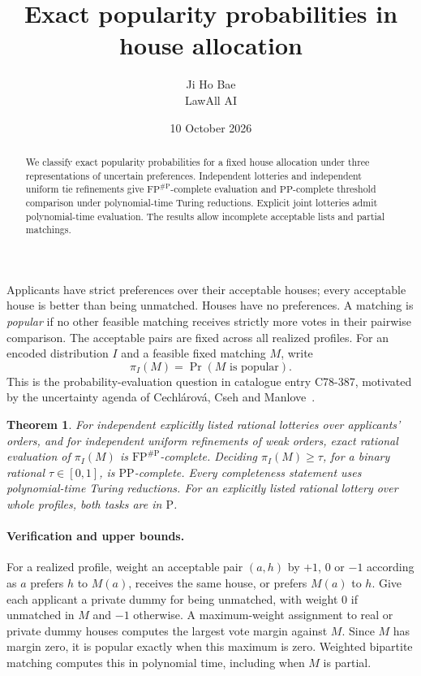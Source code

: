 \documentclass[11pt]{article}
\title{Exact popularity probabilities in house allocation}
\author{Ji Ho Bae\\\small LawAll AI}
\date{10 October 2026}
\newtheorem{theorem}{Theorem}
\newcommand{\PP}{\mathrm{PP}}
\newcommand{\FP}{\mathrm{FP}}
\newcommand{\sharpP}{\#\mathrm P}
\newcommand{\Prob}{\mathop{\mathrm{Pr}}}
\begin{document}
\maketitle
\begin{abstract}
We classify exact popularity probabilities for a fixed house allocation under three representations of uncertain preferences. Independent lotteries and independent uniform tie refinements give $\FP^{\sharpP}$-complete evaluation and $\PP$-complete threshold comparison under polynomial-time Turing reductions. Explicit joint lotteries admit polynomial-time evaluation. The results allow incomplete acceptable lists and partial matchings.
\end{abstract}

Applicants have strict preferences over their acceptable houses; every acceptable house is better than being unmatched. Houses have no preferences. A matching is \emph{popular} if no other feasible matching receives strictly more votes in their pairwise comparison. The acceptable pairs are fixed across all realized profiles. For an encoded distribution $I$ and a feasible fixed matching $M$, write
\[
 \pi_I(M)=\Prob(M\text{ is popular}).
\]
This is the probability-evaluation question in catalogue entry C78-387, motivated by the uncertainty agenda of Cechl\'arov\'a, Cseh and Manlove~\cite[\S3.1.2]{survey}.

\begin{theorem}\label{thm:main}
For independent explicitly listed rational lotteries over applicants' orders, and for independent uniform refinements of weak orders, exact rational evaluation of $\pi_I(M)$ is $\FP^{\sharpP}$-complete. Deciding $\pi_I(M)\geq\tau$, for a binary rational $\tau\in[0,1]$, is $\PP$-complete. Every completeness statement uses polynomial-time Turing reductions. For an explicitly listed rational lottery over whole profiles, both tasks are in $\mathrm P$.
\end{theorem}

\paragraph{Verification and upper bounds.}
For a realized profile, weight an acceptable pair $(a,h)$ by $+1$, $0$ or $-1$ according as $a$ prefers $h$ to $M(a)$, receives the same house, or prefers $M(a)$ to $h$. Give each applicant a private dummy for being unmatched, with weight $0$ if unmatched in $M$ and $-1$ otherwise. A maximum-weight assignment to real or private dummy houses computes the largest vote margin against $M$. Since $M$ has margin zero, it is popular exactly when this maximum is zero. Weighted bipartite matching computes this in polynomial time, including when $M$ is partial.
\end{document}
